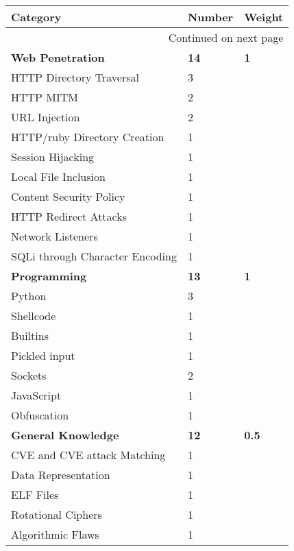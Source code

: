 \documentclass[twoside,a4paper,11pt]{report}
\begin{document}
			\begin{center}
				\begin{longtable}{| l | l | l |}
					\hline
					\textbf{Category} & \textbf{Number} & \textbf{Weight} \\ \hline 
					\endhead
					\multicolumn{3}{|r|}{{Continued on next page}} \\ \hline
					\endfoot
					\endlastfoot
					\textbf{Web Penetration} & \textbf{14} & \textbf{1} \\ \hline
					\quad HTTP Directory Traversal & 3 & \\ \hline
					\quad HTTP MITM & 2 & \\ \hline
					\quad URL Injection & 2 & \\ \hline
					\quad HTTP/ruby Directory Creation & 1 & \\ \hline 
					\quad Session Hijacking & 1 & \\ \hline
					\quad Local File Inclusion & 1 & \\ \hline 
					\quad Content Security Policy & 1 & \\ \hline 
					\quad HTTP Redirect Attacks & 1 & \\ \hline 
					\quad Network Listeners & 1 & \\ \hline 
					\quad SQLi through Character Encoding & 1 & \\ \hline 
					\newpage
					\textbf{Programming} & \textbf{13} & \textbf{1} \\ \hline
					\quad Python & 3 & \\ \hline 
						\qquad Shellcode & 1 & \\ \hline 
						\qquad Builtins & 1 & \\ \hline 
						\qquad Pickled input & 1 & \\ \hline 
					\quad Sockets & 2 & \\ \hline 
					\quad JavaScript & 1 & \\ \hline 
					\quad Obfuscation & 1 & \\ \hline
					\textbf{General Knowledge} & \textbf{12} & \textbf{0.5}\\ \hline 
					\quad CVE and CVE attack Matching & 1 & \\ \hline 
					\quad Data Representation & 1 & \\ \hline
					\quad ELF Files & 1 & \\ \hline
					\quad Rotational Ciphers & 1 & \\ \hline
					\quad Algorithmic Flaws & 1 & \\ \hline 

\end{longtable}
\end{center}
\end{document}
